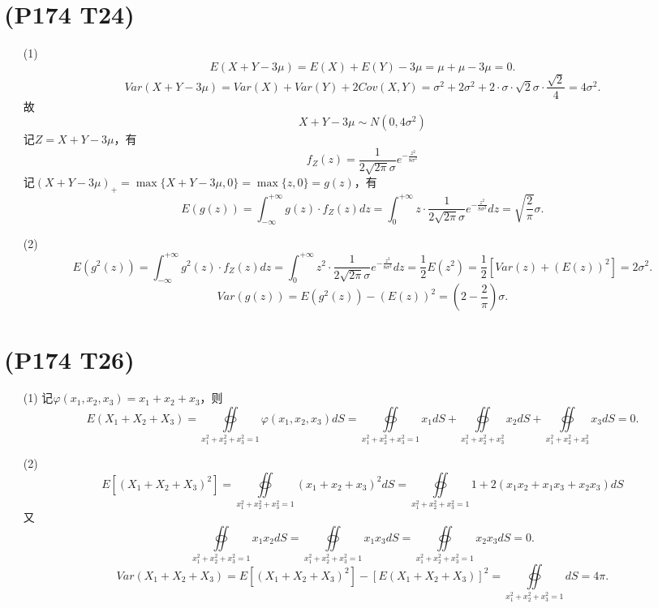 \documentclass{article}
\begin{document}
\section{(P174 T24)}  %
\begin{enumerate}
    \item [(1)]
    \[
        E(X+Y-3\mu)
        = E(X) + E(Y) - 3\mu
        = \mu + \mu - 3\mu 
        = 0.   
    \]
    \[
        Var(X+Y-3\mu)
        = Var(X) + Var(Y) + 2 Cov(X,Y)
        = \sigma^2 + 2\sigma^2 
        + 2 \cdot \sigma \cdot \sqrt{2}\sigma \cdot \frac{\sqrt{2}}{4}
        = 4\sigma^2 .
    \]
    故
    \[
        X+Y-3\mu \sim N(0 , 4\sigma^2)    
    \]
    记$Z= X+Y-3\mu$，有
    \[
        f_{Z} (z)
        = \frac{1}{2\sqrt{2\pi} \sigma} e^{-\frac{z^2}{8 \sigma^2}}
    \]
    记${(X+Y-3\mu)}_{+} = \max\{ X+Y-3\mu , 0 \} = \max\{ z, 0 \} = g(z)$，有
    \[
        E(g(z))
        = \int_{-\infty}^{+\infty} g(z)\cdot f_{Z} (z) dz
        = \int_{0}^{+\infty} z \cdot \frac{1}{2\sqrt{2\pi} \sigma} e^{-\frac{z^2}{8 \sigma^2}} dz
        = \sqrt{\frac{2}{\pi}} \sigma .
    \]
    \item [(2)]
    \[
        E\left( g^2 (z) \right)  
        = \int_{-\infty}^{+\infty} g^2 (z)\cdot f_{Z} (z) dz
        = \int_{0}^{+\infty} z^2 \cdot \frac{1}{2\sqrt{2\pi} \sigma} e^{-\frac{z^2}{8 \sigma^2}} dz
        = \frac{1}{2} E(z^2)
        = \frac{1}{2} \left[ Var(z) + {(E(z))}^2 \right]
        = 2 \sigma^2 .
    \]
    \[
        Var(g(z)) 
        = E(g^2 (z)) - {\left( E(z) \right)}^2
        = (2-\frac{2}{\pi}) \sigma.
    \]
\end{enumerate}

\section{(P174 T26)}  %
\begin{enumerate}
    \item [(1)]
    记$\varphi (x_1 , x_2 , x_3) = x_1 + x_2 + x_3$，则
    \[
        E(X_1 + X_2 + X_3)
        = \oiint\limits_{x_1^2 + x_2^2 + x_3^2 = 1} \varphi(x_1 , x_2 , x_3) dS
        = \oiint\limits_{x_1^2 + x_2^2 + x_3^2 = 1} x_1 dS + \oiint\limits_{x_1^2 + x_2^2 + x_3^2} x_2 dS + \oiint\limits_{x_1^2 + x_2^2 + x_3^2} x_3 dS
        = 0.
    \]
    \item [(2)]
    \[
        E\left[ {(X_1 + X_2 + X_3)}^2\right]
        = \oiint\limits_{x_1^2 + x_2^2 + x_3^2 = 1} {(x_1 + x_2 + x_3)}^2 dS
        = \oiint\limits_{x_1^2 + x_2^2 + x_3^2 = 1} 1 + 2 (x_1 x_2 + x_1 x_3 + x_2 x_3) dS
    \]
    又
    \[
        \oiint\limits_{x_1^2 + x_2^2 + x_3^2 = 1} x_1 x_2 dS 
        = \oiint\limits_{x_1^2 + x_2^2 + x_3^2 = 1} x_1 x_3 dS 
        = \oiint\limits_{x_1^2 + x_2^2 + x_3^2 = 1} x_2 x_3 dS
        = 0.
    \]
    \[
        Var(X_1 + X_2 + X_3)
        = E\left[ {(X_1 + X_2 + X_3)}^2\right] - {\left[E(X_1 + X_2 + X_3) \right]}^2 
        = \oiint\limits_{x_1^2 + x_2^2 + x_3^2 = 1} dS
        = 4\pi .
    \]
\end{enumerate}
\end{document}
